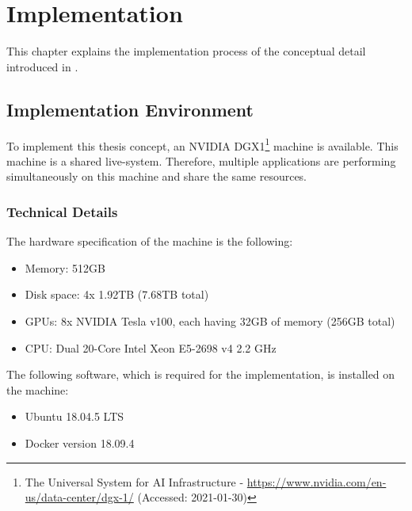 \chapter{Implementation}
\label{chap:06_implementation}

This chapter explains the implementation process of the conceptual detail introduced in .


\section{Implementation Environment}
\label{sec:06_impl-env}
To implement this thesis concept, an NVIDIA DGX1\footnote{The Universal System for AI Infrastructure - \url{https://www.nvidia.com/en-us/data-center/dgx-1/} (Accessed: 2021-01-30)} machine is available. 
This machine is a shared live-system. Therefore, multiple applications are performing simultaneously on this machine and share the same resources.


\subsection{Technical Details}
The hardware specification of the machine is the following:
\begin{itemize}
\item Memory: 512GB
\item Disk space: 4x 1.92TB (7.68TB total)
\item GPUs: 8x NVIDIA Tesla v100, each having 32GB of memory (256GB total)
\item CPU: Dual 20-Core Intel Xeon E5-2698 v4 2.2 GHz
\end{itemize}


The following software, which is required for the implementation, is installed on the machine:
\begin{itemize}
\item Ubuntu 18.04.5 LTS
\item Docker version 18.09.4
\end{itemize}


